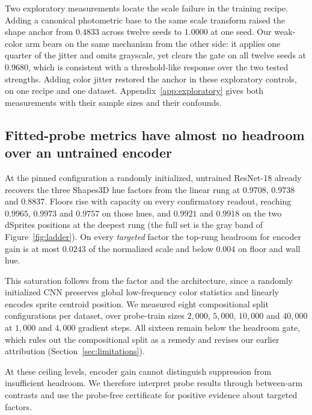 \documentclass[10pt]{article}
\begin{document}
Two exploratory measurements locate the scale failure in the training recipe. Adding a canonical
photometric base to the same scale transform raised the shape anchor from $0.4833$ across twelve
seeds to $1.0000$ at one seed. Our weak-color arm bears on the same mechanism from the other side:
it applies one quarter of the jitter and omits grayscale, yet clears the gate on all twelve seeds at
$0.9680$, which is consistent with a threshold-like response over the two tested strengths. Adding color jitter restored the anchor in these exploratory controls, on one recipe
and one dataset. Appendix~\ref{app:exploratory} gives both measurements with their sample sizes and
their confounds.

\subsection{Fitted-probe metrics have almost no headroom over an untrained encoder}
\label{sec:headroom}
At the pinned configuration a randomly initialized, untrained ResNet-18 already recovers the three
Shapes3D hue factors from the linear rung at $0.9708$, $0.9738$ and $0.8837$. Floors rise with
capacity on every confirmatory readout, reaching $0.9965$, $0.9973$ and $0.9757$ on those hues, and
$0.9921$ and $0.9918$ on the two dSprites positions at the deepest rung (the full set is the gray band of
Figure~\ref{fig:ladder}). On every \emph{targeted} factor the
top-rung headroom for encoder gain is at most $0.0243$ of the normalized scale and below $0.004$ on
floor and wall hue.

This saturation follows from the factor and the architecture, since a randomly initialized CNN
preserves global low-frequency color statistics and linearly encodes sprite centroid position. We
measured eight compositional split configurations per dataset, over probe-train sizes $2{,}000$,
$5{,}000$, $10{,}000$ and $40{,}000$ at $1{,}000$ and $4{,}000$ gradient steps. All sixteen remain
below the headroom gate, which rules out the compositional split as a remedy and revises our earlier
attribution (Section~\ref{sec:limitations}).

At these ceiling levels, encoder gain cannot distinguish suppression from insufficient headroom.
We therefore interpret probe results through between-arm contrasts and use the probe-free
certificate for positive evidence about targeted factors.
\end{document}
